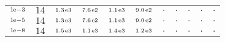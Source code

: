 \begin{tiny}
\begin{tabular}{@{$\;$}c@{$\;$}|@{$\;$}c@{$\;$}@{$\;$}c@{$\;$}@{$\;$}c@{$\;$}@{$\;$}c@{$\;$}@{$\;$}c@{$\;$}|@{$\;$}c@{$\;$}@{$\;$}c@{$\;$}@{$\;$}c@{$\;$}@{$\;$}c@{$\;$}@{$\;$}c@{$\;$}}
$\scriptstyle1\!\mathrm{\hspace{0.10em}e}-3$ & $\scriptstyle14$ & $\scriptstyle1.3\mathrm{\hspace{0.10em}e}3$ & $\scriptstyle7.6\mathrm{\hspace{0.10em}e}2$ & $\scriptstyle1.1\mathrm{\hspace{0.10em}e}3$ & $\scriptstyle9.0\mathrm{\hspace{0.10em}e}2$ & $\scriptstyle.$ & $\scriptstyle.$ & $\scriptstyle.$ & $\scriptstyle.$ & $\scriptstyle.$\\ 
$\scriptstyle1\!\mathrm{\hspace{0.10em}e}-5$ & $\scriptstyle14$ & $\scriptstyle1.3\mathrm{\hspace{0.10em}e}3$ & $\scriptstyle7.6\mathrm{\hspace{0.10em}e}2$ & $\scriptstyle1.1\mathrm{\hspace{0.10em}e}3$ & $\scriptstyle9.0\mathrm{\hspace{0.10em}e}2$ & $\scriptstyle.$ & $\scriptstyle.$ & $\scriptstyle.$ & $\scriptstyle.$ & $\scriptstyle.$\\ 
$\scriptstyle1\!\mathrm{\hspace{0.10em}e}-8$ & $\scriptstyle14$ & $\scriptstyle1.5\mathrm{\hspace{0.10em}e}3$ & $\scriptstyle1.1\mathrm{\hspace{0.10em}e}3$ & $\scriptstyle1.4\mathrm{\hspace{0.10em}e}3$ & $\scriptstyle1.2\mathrm{\hspace{0.10em}e}3$ & $\scriptstyle.$ & $\scriptstyle.$ & $\scriptstyle.$ & $\scriptstyle.$ & $\scriptstyle.$\\ 
\end{tabular} 
\end{tiny} 
